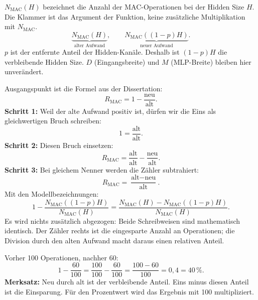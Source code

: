 $N_{\mathrm{MAC}}(H)$ bezeichnet die Anzahl der MAC-Operationen bei der Hidden Size $H$. Die Klammer ist das Argument der Funktion, keine zusätzliche Multiplikation mit $N_{\mathrm{MAC}}$.
\[
\underbrace{N_{\mathrm{MAC}}(H)}_{\text{alter Aufwand}},\qquad
\underbrace{N_{\mathrm{MAC}}((1-p)H)}_{\text{neuer Aufwand}}.
\]
$p$ ist der entfernte Anteil der Hidden-Kanäle. Deshalb ist $(1-p)H$ die verbleibende Hidden Size. $D$ (Eingangsbreite) und $M$ (MLP-Breite) bleiben hier unverändert.

Ausgangspunkt ist die Formel aus der Dissertation:
\[
R_{\mathrm{MAC}}=1-\frac{\text{neu}}{\text{alt}}.
\]
\textbf{Schritt 1:} Weil der alte Aufwand positiv ist, dürfen wir die Eins als gleichwertigen Bruch schreiben:
\[
1=\frac{\text{alt}}{\text{alt}}.
\]
\textbf{Schritt 2:} Diesen Bruch einsetzen:
\[
R_{\mathrm{MAC}}=\frac{\text{alt}}{\text{alt}}-\frac{\text{neu}}{\text{alt}}.
\]
\textbf{Schritt 3:} Bei gleichem Nenner werden die Zähler subtrahiert:
\[
\boxed{R_{\mathrm{MAC}}=\frac{\text{alt}-\text{neu}}{\text{alt}}.}
\]
Mit den Modellbezeichnungen:
\[
1-\frac{N_{\mathrm{MAC}}((1-p)H)}{N_{\mathrm{MAC}}(H)}
=\frac{N_{\mathrm{MAC}}(H)-N_{\mathrm{MAC}}((1-p)H)}{N_{\mathrm{MAC}}(H)}.
\]
Es wird nichts zusätzlich abgezogen: Beide Schreibweisen sind mathematisch identisch. Der Zähler rechts ist die eingesparte Anzahl an Operationen; die Division durch den alten Aufwand macht daraus einen relativen Anteil.

Vorher 100 Operationen, nachher 60:
\[
1-\frac{60}{100}=\frac{100}{100}-\frac{60}{100}
=\frac{100-60}{100}=0{,}4=40\,\%.
\]
\textbf{Merksatz:} Neu durch alt ist der verbleibende Anteil. Eins minus diesen Anteil ist die Einsparung. Für den Prozentwert wird das Ergebnis mit 100 multipliziert.

